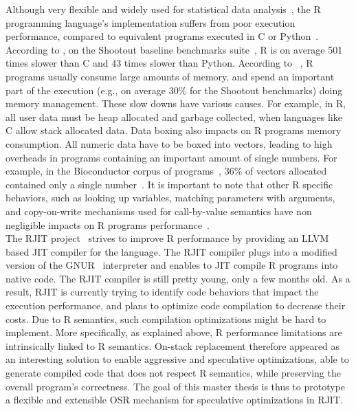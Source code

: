 Although very flexible and widely used for statistical data analysis~\cite{RUsage}, the R programming language's implementation suffers from poor execution performance, compared to equivalent programs executed in C or Python~\cite{morandat2012evaluating}.
According to , on the Shootout baseline benchmarks suite~\cite{Shootout}, R is on average 501 times slower than C and 43 times slower than Python.
According to ~\cite{morandat2012evaluating}, R programs usually consume large amounts of memory, and spend an important part of the execution (e.g., on average 30\% for the Shootout benchmarks) doing memory management.
These slow downs have various causes.
For example, in R, all user data must be heap allocated and garbage collected, when languages like C allow stack allocated data.
Data boxing also impacts on R programs memory consumption.
All numeric data have to be boxed into vectors, leading to high overheads in programs containing an important amount of single numbers.
For example, in the Bioconductor corpus of programs~\cite{Bioconductor}, 36\% of vectors allocated contained only a single number~\cite{morandat2012evaluating}.
It is important to note that other R specific behaviors, such as looking up variables, matching parameters with arguments, and copy-on-write mechanisms used for call-by-value semantics have non negligible impacts on R programs performance~\cite{morandat2012evaluating}.\\

The RJIT project~\cite{Rjit} strives to improve R performance by providing an LLVM based JIT compiler for the language.
The RJIT compiler plugs into a modified version of the GNUR~\cite{RURL} interpreter and enables to JIT compile R programs into native code.
The RJIT compiler is still pretty young, only a few months old.
As a result, RJIT is currently trying to identify code behaviors that impact the execution performance, and plans to optimize code compilation to decrease their costs.
Due to R semantics, such compilation optimizations might be hard to implement.
More specifically, as explained above, R performance limitations are intrinsically linked to R semantics.
On-stack replacement therefore appeared as an interesting solution to enable aggressive and speculative optimizations, able to generate compiled code that does not respect R semantics, while preserving the overall program's correctness.
The goal of this master thesis is thus to prototype a flexible and extensible OSR mechanism for speculative optimizations in RJIT.\\

